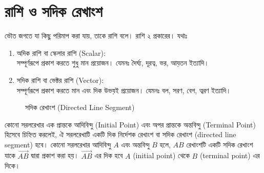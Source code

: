 \newpage
\section*{রাশি ও সদিক রেখাংশ}
\begin{tcolorbox}[colback=green!5!white, colframe=green!75!black, title=রাশি]
	ভৌত জগতে যা কিছু পরিমাপ করা যায়, তাকে রাশি বলে।
	রাশি ২ প্রকারের। যথাঃ
	\begin{enumerate}
		\item অদিক রাশি বা স্কেলার রাশি (Scalar):\\
		সম্পূর্ণরূপে প্রকাশ করতে শুধু মান প্রয়োজন। যেমনঃ দৈর্ঘ্য, দূরত্ব, ভর, আয়তন ইত্যাদি।
		\item সদিক রাশি বা ভেক্টর রাশি (Vector):\\
		সম্পূর্ণরূপে প্রকাশ করতে মান এবং দিক উভয়ই প্রয়োজন। যেমনঃ বল, সরণ, বেগ, ত্বরণ ইত্যাদি। 
	\end{enumerate}
\end{tcolorbox}
\begin{figure}[h]
	\centering
	
	\caption{সদিক রেখাংশ (Directed Line Segment)}
	\label{vec-fig}
\end{figure}
\begin{tcolorbox}[colback=green!5!white, colframe=green!75!black,title=দিক নির্দেশক রেখাংশ বা সদিক রেখাংশ] 
	কোনো সরলরেখার এক প্রান্তকে আদিবিন্দু (Initial Point) এবং অপর প্রান্তকে অন্তবিন্দু (Terminal Point) হিসেবে চিহ্নিত করলেই, ঐ সরলরেখাটি একটি দিক নির্দেশক রেখাংশ বা সদিক রেখাংশ (directed line segment) হবে। কোনো সরলরেখার আদিবিন্দু $A$ এবং অন্তবিন্দু $B$ হলে, $AB$ রেখাংশটি একটি সদিক রেখাংশ যাকে $\overrightarrow{AB}$ দ্বারা প্রকাশ করা হয়। $\overrightarrow{AB}$ এর দিক হবে $A$ (initial point) থেকে $B$ (terminal point) এর দিকে।
\end{tcolorbox}
\newpage
